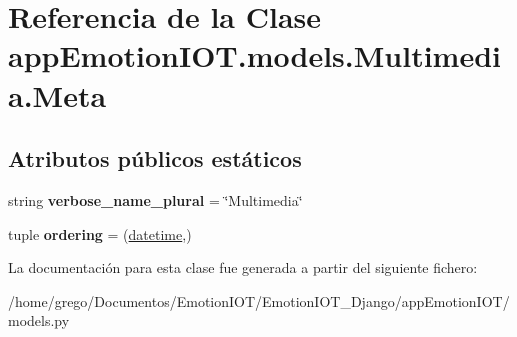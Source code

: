 \hypertarget{classappEmotionIOT_1_1models_1_1Multimedia_1_1Meta}{}\section{Referencia de la Clase app\+Emotion\+I\+O\+T.\+models.\+Multimedia.\+Meta}
\label{classappEmotionIOT_1_1models_1_1Multimedia_1_1Meta}
\subsection*{Atributos públicos estáticos}
\begin{DoxyCompactItemize}
\item 
string {\bfseries verbose\+\_\+name\+\_\+plural} = \char`\"{}Multimedia\char`\"{}\hypertarget{classappEmotionIOT_1_1models_1_1Multimedia_1_1Meta_a31e4110465a4fbc895cddf71baa11601}{}\label{classappEmotionIOT_1_1models_1_1Multimedia_1_1Meta_a31e4110465a4fbc895cddf71baa11601}

\item 
tuple {\bfseries ordering} = (\textquotesingle{}\hyperlink{classappEmotionIOT_1_1models_1_1Multimedia_a8def042968909dd0e9f26eff62b9ac48}{datetime}\textquotesingle{},)\hypertarget{classappEmotionIOT_1_1models_1_1Multimedia_1_1Meta_a9d85e869a9cc0694f7804cec0813288d}{}\label{classappEmotionIOT_1_1models_1_1Multimedia_1_1Meta_a9d85e869a9cc0694f7804cec0813288d}

\end{DoxyCompactItemize}


La documentación para esta clase fue generada a partir del siguiente fichero\+:\begin{DoxyCompactItemize}
\item 
/home/grego/\+Documentos/\+Emotion\+I\+O\+T/\+Emotion\+I\+O\+T\+\_\+\+Django/app\+Emotion\+I\+O\+T/models.\+py\end{DoxyCompactItemize}
